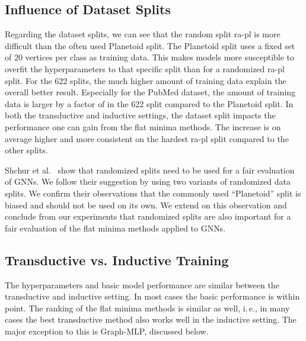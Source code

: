 \documentclass[runningheads]{llncs}
\newcommand{\ie}{i.\,e.,\xspace}
\newcommand{\GraphMLP}{Graph-MLP\xspace}
\begin{document}
\subsection{Influence of Dataset Splits}
Regarding the dataset splits, we can see that the random split ra-pl is more difficult than the often used Planetoid split.
The Planetoid split uses a fixed set of 20 vertices per class as training data.
This makes models more susceptible to overfit the hyperparameters to that specific split than for a randomized ra-pl split.
For the 622 splits, the much higher amount of training data explain the overall better result.
Especially for the PubMed dataset, the amount of training data is larger by a factor of  in the 622 split compared to the Planetoid split. 
In both the transductive and inductive settings, the dataset split impacts the performance one can gain from the flat minima methods.
The increase is on average higher and more consistent on the hardest ra-pl split compared to the other splits.

Shchur et al.~\cite{Shchur18pitfalls} show that randomized splits need to be used for a fair evaluation of GNNs.
We follow their suggestion by using two variants of randomized data splits. 
We confirm their observations that the commonly used ``Planetoid'' split is biased and should not be used on its own.
We extend on this observation and conclude from our experiments that randomized splits are also important for a fair evaluation of the flat minima methods applied to GNNs.



\subsection{Transductive vs. Inductive Training}
The hyperparameters and basic model performance are similar between the transductive and inductive setting.
In most cases the basic performance is within  point.
The ranking of the flat minima methods is similar as well, \ie in many cases the best transductive method also works well in the inductive setting.
The major exception to this is \GraphMLP, discussed below.
\end{document}
